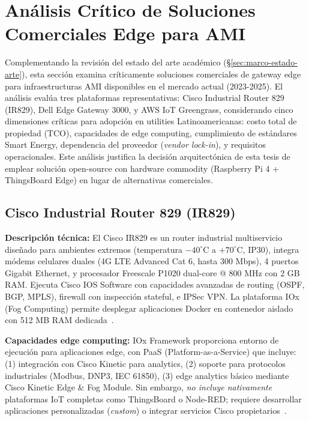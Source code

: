\section{Análisis Crítico de Soluciones Comerciales Edge para AMI}
\label{sec:marco-soluciones-comerciales}

Complementando la revisión del estado del arte académico (\S\ref{sec:marco-estado-arte}), esta sección examina críticamente soluciones comerciales de gateway edge para infraestructuras AMI disponibles en el mercado actual (2023-2025). El análisis evalúa tres plataformas representativas: Cisco Industrial Router 829 (IR829), Dell Edge Gateway 3000, y AWS IoT Greengrass, considerando cinco dimensiones críticas para adopción en utilities Latinoamericanas: costo total de propiedad (TCO), capacidades de edge computing, cumplimiento de estándares Smart Energy, dependencia del proveedor (\textit{vendor lock-in}), y requisitos operacionales. Este análisis justifica la decisión arquitectónica de esta tesis de emplear solución open-source con hardware commodity (Raspberry Pi 4 + ThingsBoard Edge) en lugar de alternativas comerciales.

\subsection{Cisco Industrial Router 829 (IR829)}
\label{sec:marco-cisco-ir829}

\textbf{Descripción técnica:} El Cisco IR829 es un router industrial multiservicio diseñado para ambientes extremos (temperatura $-40^\circ$C a $+70^\circ$C, IP30), integra módems celulares duales (4G LTE Advanced Cat 6, hasta 300 Mbps), 4 puertos Gigabit Ethernet, y procesador Freescale P1020 dual-core @ 800 MHz con 2 GB RAM. Ejecuta Cisco IOS Software con capacidades avanzadas de routing (OSPF, BGP, MPLS), firewall con inspección stateful, e IPSec VPN. La plataforma IOx (Fog Computing) permite desplegar aplicaciones Docker en contenedor aislado con 512 MB RAM dedicada~\cite{ciscoCiscoIndustrialRouters2024}.

\textbf{Capacidades edge computing:} IOx Framework proporciona entorno de ejecución para aplicaciones edge, con PaaS (Platform-as-a-Service) que incluye: (1) integración con Cisco Kinetic para analytics, (2) soporte para protocolos industriales (Modbus, DNP3, IEC 61850), (3) edge analytics básico mediante Cisco Kinetic Edge \& Fog Module. Sin embargo, \textit{no incluye nativamente} plataformas IoT completas como ThingsBoard o Node-RED; requiere desarrollar aplicaciones personalizadas (\textit{custom}) o integrar servicios Cisco propietarios~\cite{ciscoCiscoIoTFieldNetwork2023}.

